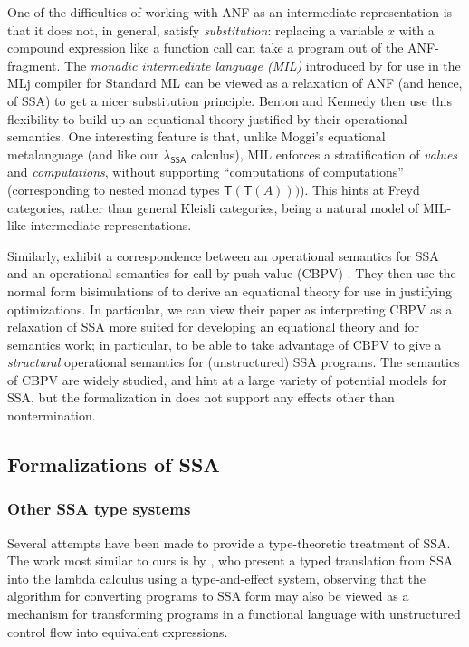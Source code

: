 \documentclass[acmsmall,screen,review]{acmart}
\newcommand{\ms}[1]{\ensuremath{\mathsf{#1}}}
\newcommand{\isotopessa}{\(\lambda_{\ms{SSA}}\)}
\begin{document}
One of the difficulties of working with ANF as an intermediate representation is that it does not,
in general, satisfy \emph{substitution}: replacing a variable $x$ with a compound expression like a
function call can take a program out of the ANF-fragment. The \emph{monadic intermediate language
(MIL)} introduced by \citet{benton-kennedy-99} for use in the MLj compiler for Standard ML can be
viewed as a relaxation of ANF (and hence, of SSA) to get a nicer substitution principle. Benton and
Kennedy then use this flexibility to build up an equational theory justified by their operational
semantics. One interesting feature is that, unlike Moggi's equational metalanguage
\cite{moggi-91-monad} (and like our \isotopessa{} calculus), MIL enforces a stratification of
\emph{values} and \emph{computations}, without supporting ``computations of computations''
(corresponding to nested monad types $\ms{T}(\ms{T}(A)))$). This hints at Freyd categories, rather
than general Kleisli categories, being a natural model of MIL-like intermediate representations.

Similarly, \citet{garbuzov-structural-cfg-2018} exhibit a correspondence between an operational
semantics for SSA and an operational semantics for call-by-push-value (CBPV) \cite{cbpv}. They then
use the normal form bisimulations of \citet{lassen-bisim} to derive an equational theory for use in
justifying optimizations. In particular, we can view their paper as interpreting CBPV as a
relaxation of SSA more suited for developing an equational theory and for semantics work; in
particular, to be able to take advantage of CBPV to give a \emph{structural} operational semantics
for (unstructured) SSA programs. The semantics of CBPV are widely studied, and hint at a large
variety of potential models for SSA, but the formalization in \cite{garbuzov-structural-cfg-2018}
does not support any effects other than nontermination.

\subsection{Formalizations of SSA}

\subsubsection{Other SSA type systems}

Several attempts have been made to provide a type-theoretic treatment of SSA. The work most similar
to ours is by \citet{typed-effect-ssa-rigon-torrens-vasconcellos-20}, who present a typed
translation from SSA into the lambda calculus using a type-and-effect system, observing that the
algorithm for converting programs to SSA form may also be viewed as a mechanism for transforming
programs in a functional language with unstructured control flow into equivalent expressions.
\end{document}
